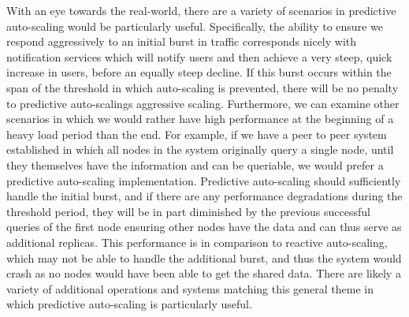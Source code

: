 With an eye towards the real-world, there are a variety of scenarios in
predictive auto-scaling would be particularly useful. Specifically, the ability
to ensure we respond aggressively to an initial burst in traffic corresponds
nicely with notification services which will notify users and then achieve a
very steep, quick increase in users, before an equally steep decline. If this
burst occurs within the span of the threshold in which auto-scaling is
prevented, there will be no penalty to predictive auto-scalings aggressive
scaling. Furthermore, we can examine other scenarios in which we would rather
have high performance at the beginning of a heavy load period than the end. For
example, if we have a peer to peer system established in which all nodes in the
system originally query a single node, until they themselves have the
information and can be queriable, we would prefer a predictive auto-scaling
implementation. Predictive auto-scaling should sufficiently handle the initial
burst, and if there are any performance degradations during the threshold
period, they will be in part diminished by the previous successful queries of
the first node ensuring other nodes have the data and can thus serve as
additional replicas. This performance is in comparison to reactive auto-scaling,
which may not be able to handle the additional burst, and thus the system would
crash as no nodes would have been able to get the shared data. There are likely
a variety of additional operations and systems matching this general theme in
which predictive auto-scaling is particularly useful.
